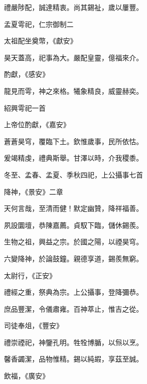 \begin{pinyinscope}
 禮嚴陟配，誠達精衷。尚其錫祉，歲以屢豐。



 孟夏雩祀，仁宗御制二



 太祖配坐奠幣，《獻安》



 昊天蓋高，祀事為大。嚴配皇靈，億福來介。



 酌獻，《感安》



 龍見而雩，神之來格。犧象精良，威靈赫奕。



 紹興雩祀一首



 上帝位酌獻，《嘉安》



 蒼蒼昊穹，覆臨下土。欽惟歲事，民所依怙。



 爰竭精虔，禮典斯舉。甘澤以時，介我稷黍。



 冬至、孟春、孟夏、季秋四祀，上公攝事七首



 降神，《景安》二章



 天何言哉，至清而健！默定幽贊，降祥福善。



 夙設圜壇，恭陳嘉薦。貞馭下臨，儲休錫羨。



 生物之祖，興益之宗。於國之陽，以禋昊穹。



 六變降神，於論鼓鐘。親德享道，錫羨無窮。



 太尉行，《正安》



 禮經之重，祭典為宗。上公攝事，登降彌恭。



 庶品豐潔，令儀肅雍。百神萃止，惟吉之從。



 司徒奉俎，《豐安》



 禮崇禋祀，神鑒孔明。牲牷博腯，以炰以烹。



 馨香蠲潔，品物惟精。錫以純嘏，享茲至誠。



 飲福，《廣安》




\end{pinyinscope}
